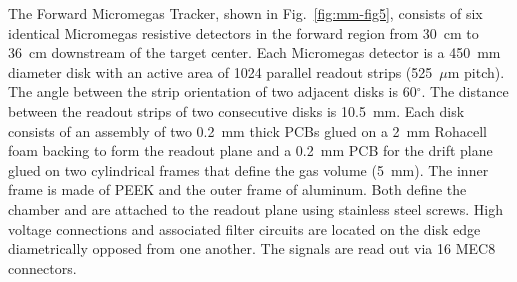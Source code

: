 The Forward Micromegas Tracker, shown in Fig.~\ref{fig:mm-fig5}, consists of six identical Micromegas resistive detectors in
the forward region from 30~cm to 36~cm downstream of the target center. Each Micromegas detector is a 450~mm diameter disk with an
active area of 1024 parallel readout strips (525~$\mu$m pitch). The angle between the strip orientation of two adjacent disks
is 60$^\circ$. The distance between the readout strips of two consecutive disks is 10.5~mm.  Each disk consists of an assembly
of two 0.2~mm thick PCBs glued on a 2~mm Rohacell foam backing to form the readout plane and a 0.2~mm PCB for the drift plane
glued on two cylindrical frames that define the gas volume (5~mm). The inner frame is made of PEEK and the outer frame of
aluminum. Both define the chamber and are attached to the readout plane using stainless steel screws. High voltage connections
and associated filter circuits are located on the disk edge diametrically opposed from one another. The signals are read out via
16 MEC8 connectors.

